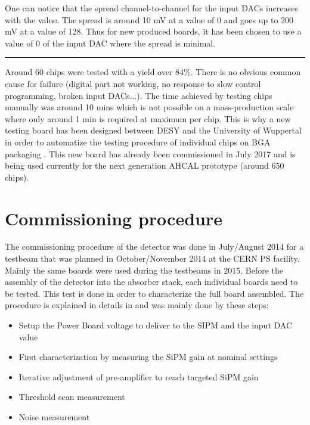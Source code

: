 One can notice that the spread channel-to-channel for the input DACs increases with the value. The spread is around 10 mV at a value of 0 and goes up to 200 mV at a value of 128. Thus for new produced boards, it has been chosen to use a value of 0 of the input DAC where the spread is minimal.

\begin{center}
  \rule{0.5\textwidth}{.4pt}
\end{center}

Around 60 chips were tested with a yield over 84\%. There is no obvious common cause for failure (digital part not working, no response to slow control programming, broken input DACs...). The time achieved by testing chips manually was around 10 mins which is not possible on a mass-production scale where only around 1 min is required at maximum per chip. This is why a new testing board has been designed between DESY and the University of Wuppertal in order to automatize the testing procedure of individual chips on BGA packaging \cite{AHCALMain2016_Amine}. This new board has already been commissioned in July 2017 and is being used currently for the next generation AHCAL prototype (around 650 chips).

\section{Commissioning procedure}

The commissioning procedure of the detector was done in July/August 2014 for a testbeam that was planned in October/November 2014 at the CERN PS facility. Mainly the same boards were used during the testbeams in 2015. Before the assembly of the detector into the absorber stack, each individual boards need to be tested. This test is done in order to characterize the full board assembled. The procedure is explained in details in \cite{Hartbrich2012} and was mainly done by these steps:

\begin{itemize}
  \item Setup the Power Board voltage to deliver to the SIPM and the input DAC value
  \item First characterization by measuring the SiPM gain at nominal settings
  \item Iterative adjustment of pre-amplifier to reach targeted SiPM gain
  \item Threshold scan measurement
  \item Noise measurement
\end{itemize}


